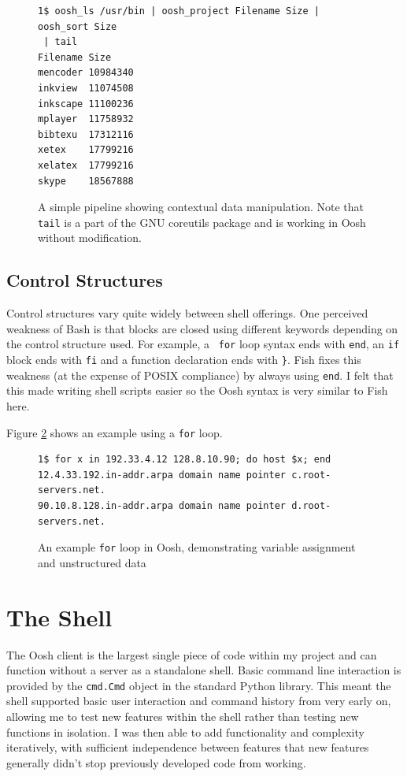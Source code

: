 \documentclass[12pt,twoside,notitlepage]{report}
\begin{document}
\begin{figure}[h]
\begin{Verbatim}[frame=single,framerule=0.2pt,framesep=5pt]
1$ oosh_ls /usr/bin | oosh_project Filename Size | oosh_sort Size
 | tail
Filename Size
mencoder 10984340
inkview  11074508
inkscape 11100236
mplayer  11758932
bibtexu  17312116
xetex    17799216
xelatex  17799216
skype    18567888
\end{Verbatim}
  \caption{A simple pipeline showing contextual data
    manipulation. Note that {\tt tail} is a part of the GNU coreutils
    package and is working in Oosh without modification.}
\label{lsexample}
\end{figure}

\subsection{Control Structures}

Control structures vary quite widely between shell offerings. One
perceived weakness of Bash is that blocks are closed using different
keywords depending on the control structure used. For example, a {\tt
  for} loop syntax ends with {\tt end}, an {\tt if} block ends with
{\tt fi} and a function declaration ends with {\tt \}}. Fish fixes
this weakness (at the expense of POSIX compliance) by always using
{\tt end}. I felt that this made writing shell scripts easier so the
Oosh syntax is very similar to Fish here.

Figure \ref{forloop} shows an example using a {\tt for} loop.

\begin{figure}[h]
\begin{Verbatim}[frame=single,framerule=0.2pt,framesep=5pt]
1$ for x in 192.33.4.12 128.8.10.90; do host $x; end
12.4.33.192.in-addr.arpa domain name pointer c.root-servers.net.
90.10.8.128.in-addr.arpa domain name pointer d.root-servers.net.
\end{Verbatim}
\caption{An example {\tt for} loop in Oosh, demonstrating variable
  assignment and unstructured data}
\label{forloop}
\end{figure}

\section{The Shell}
The Oosh client is the largest single piece of code within my project
and can function without a server as a standalone shell. Basic command
line interaction is provided by the {\tt cmd.Cmd} object in the
standard Python library. This meant the shell supported basic user
interaction and command history from very early on, allowing me to
test new features within the shell rather than testing new functions
in isolation. I was then able to add functionality and complexity
iteratively, with sufficient independence between features that new
features generally didn't stop previously developed code from working.
\end{document}
